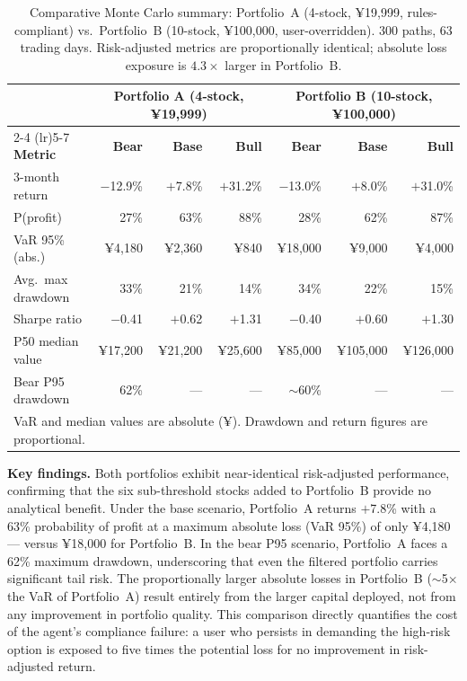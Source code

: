 \documentclass[11pt,a4paper]{article}
\begin{document}
\begin{table}[h!]
  \centering
  \caption{Comparative Monte Carlo summary: Portfolio~A (4-stock,
           ¥19,999, rules-compliant) vs.\ Portfolio~B (10-stock,
           ¥100,000, user-overridden). 300 paths, 63 trading days.
           Risk-adjusted metrics are proportionally identical; absolute
           loss exposure is $4.3\times$ larger in Portfolio~B.}
  \label{tab:mc_compare}
  \begin{tabular}{lrrrrrr}
    \toprule
    & \multicolumn{3}{c}{\textbf{Portfolio A (4-stock, ¥19,999)}}
    & \multicolumn{3}{c}{\textbf{Portfolio B (10-stock, ¥100,000)}} \\
    \cmidrule(lr){2-4} \cmidrule(lr){5-7}
    \textbf{Metric} & \textbf{Bear} & \textbf{Base} & \textbf{Bull}
                    & \textbf{Bear} & \textbf{Base} & \textbf{Bull} \\
    \midrule
    3-month return     & $-$12.9\% & $+$7.8\%  & $+$31.2\%
                       & $-$13.0\% & $+$8.0\%  & $+$31.0\% \\
    P(profit)          & 27\%      & 63\%      & 88\%
                       & 28\%      & 62\%      & 87\% \\
    VaR 95\% (abs.)    & ¥4,180    & ¥2,360    & ¥840
                       & ¥18,000   & ¥9,000    & ¥4,000 \\
    Avg.\ max drawdown & 33\%      & 21\%      & 14\%
                       & 34\%      & 22\%      & 15\% \\
    Sharpe ratio       & $-$0.41   & $+$0.62   & $+$1.31
                       & $-$0.40   & $+$0.60   & $+$1.30 \\
    P50 median value   & ¥17,200   & ¥21,200   & ¥25,600
                       & ¥85,000   & ¥105,000  & ¥126,000 \\
    Bear P95 drawdown  & 62\%      & ---       & ---
                       & $\sim$60\%& ---       & --- \\
    \bottomrule
    \multicolumn{7}{l}{\small VaR and median values are absolute (¥).
      Drawdown and return figures are proportional.}
  \end{tabular}
\end{table}

\textbf{Key findings.}
Both portfolios exhibit near-identical risk-adjusted performance, confirming
that the six sub-threshold stocks added to Portfolio~B provide no
analytical benefit. Under the base scenario, Portfolio~A returns $+$7.8\%
with a 63\% probability of profit at a maximum absolute loss (VaR 95\%)
of only ¥4,180 --- versus ¥18,000 for Portfolio~B. In the bear P95
scenario, Portfolio~A faces a 62\% maximum drawdown, underscoring that
even the filtered portfolio carries significant tail risk. The
proportionally larger absolute losses in Portfolio~B ($\sim$5$\times$
the VaR of Portfolio~A) result entirely from the larger capital
deployed, not from any improvement in portfolio quality. This comparison
directly quantifies the cost of the agent's compliance failure: a user
who persists in demanding the high-risk option is exposed to five times
the potential loss for no improvement in risk-adjusted return.
\end{document}
